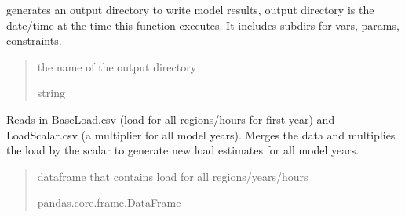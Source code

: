 \documentclass[letterpaper,10pt,english]{sphinxmanual}
\begin{document}

\begin{fulllineitems}
\label{\detokenize{src.common.utilities:src.common.utilities.make_dir}}
\pysigstartsignatures
\pysiglinewithargsret
{}
{}
{}
\pysigstopsignatures
\sphinxAtStartPar
generates an output directory to write model results, output directory is the date/time
at the time this function executes. It includes subdirs for vars, params, constraints.
\begin{quote}\begin{description}
\sphinxAtStartPar
the name of the output directory

\sphinxAtStartPar
string

\end{description}\end{quote}

\end{fulllineitems}


\begin{fulllineitems}
\label{\detokenize{src.common.utilities:src.common.utilities.scale_load}}
\pysigstartsignatures
\pysiglinewithargsret
{}
{}
{}
\pysigstopsignatures
\sphinxAtStartPar
Reads in BaseLoad.csv (load for all regions/hours for first year)
and LoadScalar.csv (a multiplier for all model years). Merges the
data and multiplies the load by the scalar to generate new load
estimates for all model years.
\begin{quote}\begin{description}
\sphinxAtStartPar
dataframe that contains load for all regions/years/hours

\sphinxAtStartPar
pandas.core.frame.DataFrame

\end{description}\end{quote}

\end{fulllineitems}
\end{document}
